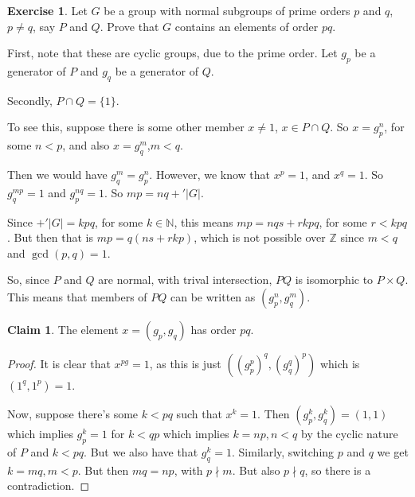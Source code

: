 \documentclass[11pt,oneside]{article}
\numberwithin{equation}{section}
\theoremstyle{definition}
\newtheorem{exercise}{Exercise}
\newtheorem*{claim}{Claim}
\def\pmod{+'}
\def\ZZ{\mathbb{Z}}
\def\NN{\mathbb{N}}
\begin{document}
\begin{exercise}
  \label{ex2}
  Let $G$ be a group with normal subgroups of prime orders $p$ and
  $q$, $p \neq q$, say $P$ and $Q$. Prove that $G$ contains an
  elements of order $pq$.
\end{exercise}
\begin{solution}
  First, note that these are cyclic groups, due to the prime order.  Let
  $g_p$ be a generator of $P$ and $g_q$ be a generator of $Q$. 

  Secondly, $P \cap Q = \{1\}$.
  
  To see this, suppose there is some other
  member $ x \neq 1$, $x \in P \cap Q$.  So $x = g_p^n$, for some $n < p$, and
  also $x=g_q^m$,$m < q$.

  Then we would have $ g_q ^m = g_p^n$.  However, we know that $x ^ p
  = 1$, and $x^q = 1$.  So $g_q ^ {m p } = 1$ and $g_p ^ {n q} = 1$.
  So $mp = nq \pmod |G|$.

  
  Since $ \pmod |G| = k p q$, for some $k \in \NN$, this
  means $mp = nqs + rkpq$, for some $ r < k p q$.  But
  then that is $mp = q ( ns + rkp)$, which is not possible
  over $\ZZ$ since $m < q$ and $\gcd(p, q) = 1$.

  So, since $P$ and $Q$ are normal, with trival intersection, $PQ$ is
  isomorphic to $P \times Q$.  This means that members of $ PQ$ can be
  written as $(g_p^n, g_q^m)$.

  \begin{claim}
    The element $x = (g_p, g_q)$ has order $pq$.
  \end{claim}
  \begin{proof}
    It is clear that $x ^ {pg} = 1$, as this is just $((g_p ^ p)^q, (g_q^q)^p)$ which is $(1^q, 1^p) = 1$.
    
    Now, suppose there's some $k < pq$ such that $x^k = 1$.  Then
    $(g_p^k, g_q^k) = (1, 1)$ which implies $g_p^k = 1$ for $k < qp$
    which implies $ k = np, n<q$ by the cyclic nature of $P$ and $k<pq$.
    But we also have that $g_q ^ k =1$.  Similarly, switching $p$ and
    $q$ we get $k = mq, m < p$.  But then $mq = np$, with $ p \nmid m$.
    But also $p \nmid q$, so there is a contradiction.
  \end{proof}
\end{solution}
\end{document}
